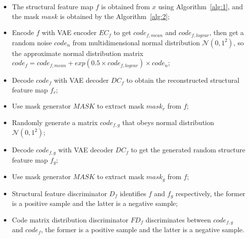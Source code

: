 \documentclass[letterpaper]{article} %
\begin{document}
\begin{itemize}
	\item The structural feature map $f$ is obtained from $x$ using Algorithm~\ref{alg:1}, and the mask $mask$ is obtained by the Algorithm~\ref{alg:2};
	\item Encode $f$ with VAE encoder $EC_f$ to get $code_{f,mean}$ and $code_{f,logvar}$, then get a random noise $code_n$ from multidimensional normal distribution $\mathcal{N}(0,1^2)$, so the approximate normal distribution matrix  $code_f=code_{f,mean}+exp(0.5\times code_{f,logvar})\times code_n$;
	\item Decode $code_f$ with VAE decoder $DC_f$ to obtain the reconstructed structural feature map $f_r$;
	\item Use mask generator $MASK$ to extract mask $mask_r$ from $f$;
	\item Randomly generate a matrix $code_{f,g}$ that obeys normal distribution $\mathcal{N}(0,1^2)$;
	\item Decode $code_{f,g}$ with VAE decoder $DC_f$ to get the generated random structure feature map $f_g$;
	\item Use mask generator $MASK$ to extract mask $mask_g$ from $f$;
	\item Structural feature discriminator $D_f$ identifies $f$ and $f_g$ respectively, the former is a positive sample and the latter is a negative sample;
	\item Code matrix distribution discriminator $FD_f$ discriminates between $code_{f,g}$ and $code_f$, the former is a positive sample and the latter is a negative sample.
\end{itemize}
\end{document}
